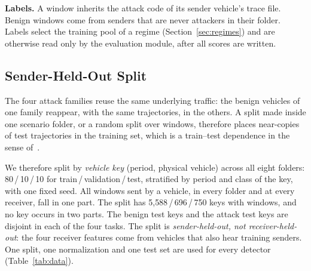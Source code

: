 \textbf{Labels.} A window inherits the attack code of its sender vehicle's trace file. Benign windows come from
senders that are never attackers in their folder. Labels select the training pool of a regime
(Section~\ref{sec:regimes}) and are otherwise read only by the evaluation module, after all scores are written.

\subsection{Sender-Held-Out Split}\label{sec:split}

The four attack families reuse the same underlying traffic: the benign vehicles of one family reappear, with the
same trajectories, in the others. A split made inside one scenario folder, or a random split over windows,
therefore places near-copies of test trajectories in the training set, which is a train--test dependence in the
sense of~\cite{kapoor2023leakage,arp2022dos}. 

We therefore split by \emph{vehicle key} (period, physical vehicle) across all eight folders: 80\,/\,10\,/\,10
for train\,/\,validation\,/\,test, stratified by period and class of the key, with one fixed seed. All windows
sent by a vehicle, in every folder and at every receiver, fall in one part. The split has 5{,}588\,/\,696\,/\,750
keys with windows, and no key occurs in two parts. The benign test keys and the attack test keys are disjoint in
each of the four tasks. The split is \emph{sender-held-out, not receiver-held-out}: the four receiver features
come from vehicles that also hear training senders. One split, one normalization and one test set are used for
every detector (Table~\ref{tab:data}).

